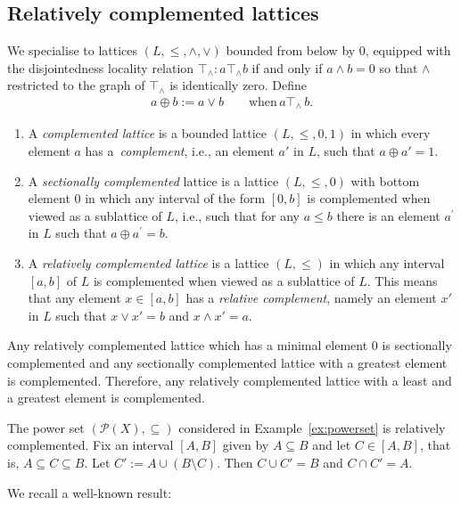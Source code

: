 \documentclass[pdftex]{sigma}
\numberwithin{equation}{section}
\newcommand{\loc}{locality\xspace}
\begin{document}
\subsection{Relatively complemented lattices}

We specialise to lattices {$(L, \leq, \wedge, \vee)$} bounded from below by $0$, equipped with the disjointedness \loc relation $\top_\wedge\colon a\top_\wedge b$ if and only if $a\wedge b=0$
so that $\wedge$ restricted to the graph of $\top_\wedge$ is identically zero.
Define
	\begin{gather*}%
	a\oplus b:=a \vee b \qquad \text{when}\, {a\top_\wedge}\,b.
\end{gather*}


\begin{Definition}\label{defn:relcomplt}\qquad
\begin{enumerate}\itemsep=0pt
\item[$(a)$] A {\it complemented lattice} is a bounded lattice $(L,\leq, 0, 1)$ in which every element $a$ has a~{\it complement}, i.e., an element $a'$ in $ L$, such that $a \oplus a' = 1$.
\item[$(b)$]
A {\it sectionally complemented } lattice 	
is a lattice $(L,\leq, 0)$ with bottom element $0$ in which any interval of the form $[0, b]$ is complemented when viewed as a sublattice of $L$, i.e., such that for any $a\le b$ there is an element $a^\prime$ in $ L$ such that $a \oplus a^\prime = b$.
\item[$(c)$] A {\it relatively complemented lattice} is a lattice $(L,\leq)$ in which any interval $[a, b]$ of $L$ is complemented when viewed as a sublattice of $L$. This means that any element $x\in [a, b]$ has a {\it relative complement}, namely an element $x'$ in $ L$ such that $x \vee x' = b$ and $x\wedge x'=a$.
\end{enumerate}
\end{Definition}

\begin{Remark}
Any relatively complemented lattice which has a minimal element $0$ is sectionally complemented and any sectionally complemented lattice with a greatest element is complemented. Therefore, any relatively complemented lattice with a least and a greatest element is complemented.
\end{Remark}

\begin{Example} 	The power set $\left({\mathcal P}(X), \subseteq \right)$ considered in Example~\ref{ex:powerset} is relatively complemented. Fix an interval $[A,B]$ given by $A\subseteq B$ and let $C\in [A,B]$, that is, $A\subseteq C \subseteq B$. Let $C':=A\cup (B\setminus C)$. Then $C\cup C'=B$ and $C\cap C'=A$.
	\end{Example}
We recall a well-known result:
\end{document}
